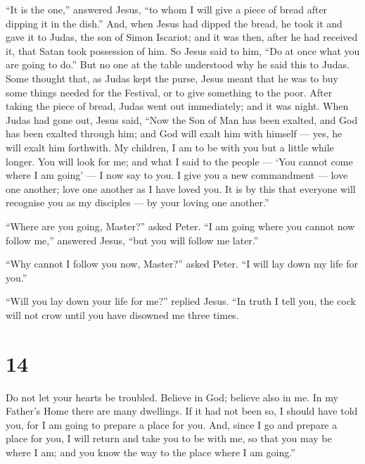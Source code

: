  ``It is the one,'' answered Jesus, ``to whom I will give a
piece of bread after dipping it in the dish.'' And, when Jesus had
dipped the bread, he took it and gave it to Judas, the son of Simon
Iscariot;  and it was then, after he had received it, that
Satan took possession of him. So Jesus said to him, ``Do at once what
you are going to do.''  But no one at the table understood
why he said this to Judas.  Some thought that, as Judas
kept the purse, Jesus meant that he was to buy some things needed for
the Festival, or to give something to the poor.  After
taking the piece of bread, Judas went out immediately; and it was night.
 When Judas had gone out, Jesus said, ``Now the Son of Man
has been exalted, and God has been exalted through him; 
and God will exalt him with himself --- yes, he will exalt him
forthwith.  My children, I am to be with you but a little
while longer. You will look for me; and what I said to the people ---
`You cannot come where I am going' --- I now say to you.  I
give you a new commandment --- love one another; love one another as I
have loved you.  It is by this that everyone will recognise
you as my disciples --- by your loving one another.''

 ``Where are you going, Master?'' asked Peter. ``I am going
where you cannot now follow me,'' answered Jesus, ``but you will follow
me later.''

 ``Why cannot I follow you now, Master?'' asked Peter. ``I
will lay down my life for you.''

 ``Will you lay down your life for me?'' replied Jesus.
``In truth I tell you, the cock will not crow until you have disowned me
three times.

\hypertarget{section-13}{%
\section{14}\label{section-13}}

 Do not let your hearts be troubled. Believe in God; believe
also in me.  In my Father's Home there are many dwellings.
If it had not been so, I should have told you, for I am going to prepare
a place for you.  And, since I go and prepare a place for
you, I will return and take you to be with me, so that you may be where
I am;  and you know the way to the place where I am going.''


